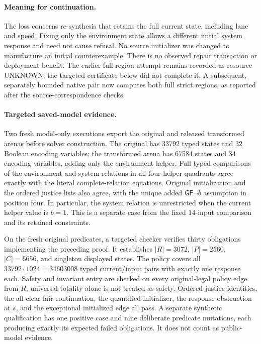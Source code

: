 \paragraph{Meaning for continuation.}
The loss concerns re-synthesis that retains the full current state,
including lane and speed. Fixing only the environment state allows a
different initial system response and need not cause refusal. No
source initializer was changed to manufacture an initial counterexample.
There is no observed repair transaction or deployment benefit.
The earlier full-region attempt remains recorded as resource UNKNOWN;
the targeted certificate below did not complete it. A subsequent,
separately bounded native pair now computes both full strict regions,
as reported after the source-correspondence checks.

\paragraph{Targeted saved-model evidence.}
Two fresh model-only executions export the original and released
transformed arenas before solver construction. The original has
33792 typed states and 32 Boolean encoding variables; the transformed
arena has 67584 states and 34 encoding variables, adding only the
environment helper. Full typed comparisons of the environment and
system relations in all four helper quadrants agree exactly with the
literal complete-relation equations. Original initialization and the
ordered justice lists also agree, with the unique added
$\mathsf{GF}\neg b$ assumption in position four. In particular, the
system relation is unrestricted when the current helper value is
$b=1$. This is a separate
case from the fixed 14-input comparison and its retained constraints.

On the fresh original predicates, a targeted checker verifies thirty
obligations implementing the preceding proof. It establishes
$|R|=3072$, $|P|=2560$, $|C|=6656$, and singleton displayed states.
The policy covers all $33792\cdot1024=34603008$ typed current/input
pairs with exactly one response each. Safety and invariant entry
are checked on every original-legal policy edge from $R$; universal
totality alone is not treated as safety. Ordered justice identities,
the all-clear fair continuation, the quantified initializer, the
response obstruction at $s$, and the exceptional initialized edge
all pass. A separate synthetic qualification has one positive case
and nine deliberate predicate mutations, each producing exactly
its expected failed obligations. It does not count as public-model
evidence.

